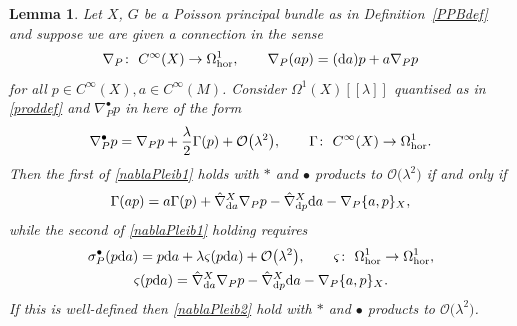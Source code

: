 \documentclass[pdftex]{sigma}
\numberwithin{equation}{section}
\newtheorem{Lemma}[Theorem]{Lemma}
\newcommand{\<}{{\langle}}
\renewcommand{\>}{{\rangle}}
\newcommand{\extd}{{\rm d}}
\begin{document}
\begin{Lemma}\label{nablabullet} Let $X$, $G$ be a Poisson principal bundle as in Definition~{\rm \ref{PPBdef}} and suppose we are given a connection in the sense
\[ \nabla_P\colon \ C^\infty(X)\to \Omega^1_{\rm hor},\qquad \nabla_P(ap)=(\extd a)p +a\nabla_Pp\]
for all $p\in C^\infty(X), a\in C^\infty(M)$. Consider $\Omega^1(X)[[\lambda]]$ quantised as in \eqref{proddef} and $\nabla^\bullet_Pp$ in here of the form
\[ \nabla^\bullet_{P}p= \nabla_Pp + \frac{\lambda}{2} \Gamma(p)+ \mathcal{O}\big(\lambda^2\big),\qquad \Gamma\colon \ C^\infty(X)\to \Omega^1_{\rm hor}.\]
Then the first of \eqref{nablaPleib1} holds with $*$ and $\bullet$ products to $\mathcal{O}\big(\lambda^2\big)$ if and only if
\begin{equation}\label{Gamma} \Gamma(ap)=a\Gamma(p)+\hat\nabla^X_{\extd a}\nabla_Pp-\hat\nabla^X_{\extd p}\extd a-\nabla_P\{a,p\}_X,\end{equation}
while the second of \eqref{nablaPleib1} holding requires
\begin{gather*} \sigma^\bullet_P(p\extd a) =p\extd a+\lambda\varsigma(p\extd a)+\mathcal{O}\big(\lambda^2\big),\qquad \varsigma\colon \ \Omega^1_{\rm hor}\to \Omega^1_{\rm hor},\nonumber\\
\varsigma(p\extd a) =\hat\nabla^X_{\extd a}\nabla_Pp-\hat\nabla^X_{\extd p}\extd a-\nabla_P\{a,p\}_X. \end{gather*}
If this is well-defined then \eqref{nablaPleib2} hold with $*$ and $\bullet$ products to $\mathcal{O}\big(\lambda^2\big)$. \end{Lemma}
\end{document}
